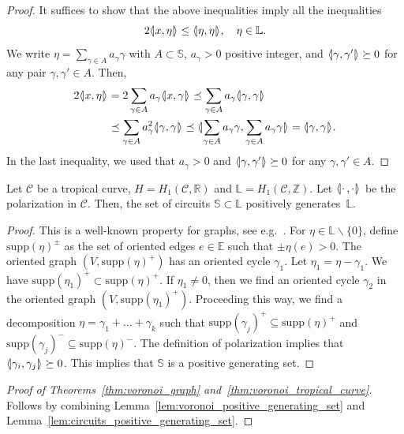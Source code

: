 \documentclass[AHL,Unicode,longabstracts]{cedram}
\newcommand{\llangle}{\mathopen{\langle\mkern -3.1mu\lvert}}
\newcommand{\rrangle}{\mathclose{\rvert\mkern -3.1mu\rangle}}
\newcommand{\highinn}[2]{{\llangle#2\rrangle_{#1}}}
\newcommand{\R}{\mathbb{R}}
\newcommand{\Z}{\mathbb{Z}}
\newcommand{\E}{\mathbb{E}}
\renewcommand{\L}{\mathbb{L}}
\renewcommand{\S}{\mathbb{S}}
\newcommand{\curve}{\mathcal{C}}
\renewcommand{\setminus}{\smallsetminus}
\newcommand{\suppp}[1]{{\mathrm{supp}(#1)^+}}
\newcommand{\suppm}[1]{{\mathrm{supp}(#1)^-}}
\newcommand{\supppm}[1]{{\mathrm{supp}(#1)^\pm}}
\begin{document}
\begin{proof}
It suffices to show that the above inequalities imply all the inequalities
\[
2\highinn{}{x,\eta} \leq \highinn{}{\eta,\eta}, \quad \eta\in \L.
\]
We write $\eta = \sum_{\gamma\in A} a_\gamma \gamma$ with $A \subset\S$, $a_\gamma >0$ positive integer, and $\highinn{}{\gamma,\gamma'} \succeq 0$ for any pair $\gamma, \gamma' \in A$. Then,
\begin{align*}
2\highinn{}{x,\eta} &= 2\sum_{\gamma \in A} a_\gamma \highinn{}{x,\gamma} \preceq \sum_{\gamma \in A} a_\gamma \highinn{}{\gamma,\gamma}\\
& \preceq \sum_{\gamma \in A} a^2_\gamma \highinn{}{\gamma, \gamma}\preceq \highinn{}{\sum_{\gamma \in A} a_\gamma \gamma,\sum_{\gamma \in A} a_\gamma \gamma} = \highinn{}{\gamma,\gamma }.
\end{align*}
In the last inequality, we used that $a_\gamma>0$ and $\highinn{}{\gamma,\gamma'} \succeq 0$ for any $\gamma, \gamma'\in A$.
\end{proof}

\begin{lemm}\label{lem:circuits_positive_generating_set}
Let $\curve$ be a tropical curve, $H = H_1(\curve, \R)$ and $\L = H_1(\curve, \Z)$. Let $\highinn{}{\cdot\,,\cdot}$ be the polarization in $\curve$. Then, the set of circuits $\S \subset \L$ positively generates~$\L$.
\end{lemm}

\begin{proof}
This is a well-known property for graphs, see e.g.~\cite[Lemma~8.3]{GZ83}. For $\eta \in \L\setminus \{0\}$, define $\supppm{\eta}$ as the set of oriented edges $e\in \E$ such that $\pm \eta(e) >0$. The oriented graph $(V, \suppp{\eta})$ has an oriented cycle $\gamma_1$. Let $\eta_1 =\eta- \gamma_1$. We have $\suppp{\eta_1} \subset \suppp{\eta}$. If $\eta_1 \neq0$, then we find an oriented cycle $\gamma_2$ in the oriented graph $(V, \suppp{\eta_1})$. Proceeding this way, we find a decomposition $\eta = \gamma_1 + \dots + \gamma_k$ such that $\suppp{\gamma_j} \subseteq \suppp{\eta}$ and $\suppm{\gamma_j} \subseteq \suppm{\eta}$. The definition of polarization implies that $\highinn{}{\gamma_i, \gamma_j}\succeq 0$. This implies that $\S$ is a positive generating set.
\end{proof}

\begin{proof}[Proof of Theorems~\ref{thm:voronoi_graph} and~\ref{thm:voronoi_tropical_curve}] Follows by combining Lemma~\ref{lem:voronoi_positive_generating_set} and Lemma~\ref{lem:circuits_positive_generating_set}.
\end{proof}
\end{document}
